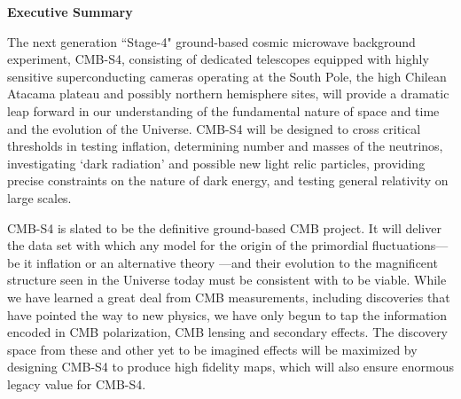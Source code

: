 \begin{center}
  {\Large \bf Executive Summary}
\end{center}

The next generation ``Stage-4" ground-based cosmic microwave background experiment, CMB-S4, consisting of dedicated telescopes equipped with highly sensitive superconducting cameras operating at the South Pole, the high Chilean Atacama plateau and possibly northern hemisphere sites, will provide a dramatic leap forward in our understanding of the fundamental nature of space and time and the evolution of the Universe. CMB-S4 will be designed to cross critical thresholds in testing inflation, determining number and masses of the neutrinos, investigating `dark radiation' and possible new light relic particles, providing precise constraints on the nature of dark energy, and testing general relativity on large scales. 

CMB-S4 is slated to be the definitive ground-based CMB project. It will deliver the data set with which any model for the origin of the primordial fluctuations--- be it inflation or an alternative theory ---and their evolution to the magnificent structure seen in the Universe today must be consistent with to be viable.  While we have learned a great deal from CMB measurements, including discoveries that have pointed the way to new physics, we have only begun to tap the information encoded in CMB polarization, CMB lensing and secondary effects.  The discovery space from these and other yet to be imagined effects will be  maximized by designing CMB-S4 to produce high fidelity maps, which will also ensure enormous legacy value for CMB-S4.


